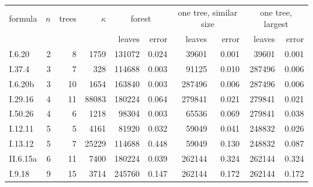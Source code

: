 \begin{tabular}{@{}lrrrrrrrrr@{}}\toprule
formula & $n$ & trees & $\kappa$ & \multicolumn{2}{c}{forest} & \multicolumn{2}{c}{one tree, similar size} & \multicolumn{2}{c}{one tree, largest}\\
 & & & & leaves & error & leaves & error & leaves & error\\\midrule
I.6.20 & 2 & 8 & 1759 & 131072 & 0.024 & 39601 & 0.001 & 39601 & 0.001\\
I.37.4 & 3 & 7 & 328 & 114688 & 0.003 & 91125 & 0.010 & 287496 & 0.006\\
I.6.20b & 3 & 10 & 1654 & 163840 & 0.003 & 287496 & 0.006 & 287496 & 0.006\\
I.29.16 & 4 & 11 & 88083 & 180224 & 0.064 & 279841 & 0.021 & 279841 & 0.021\\
I.50.26 & 4 & 6 & 1218 & 98304 & 0.003 & 65536 & 0.069 & 279841 & 0.038\\
I.12.11 & 5 & 5 & 4161 & 81920 & 0.032 & 59049 & 0.041 & 248832 & 0.026\\
I.13.12 & 5 & 7 & 25229 & 114688 & 0.448 & 59049 & 0.130 & 248832 & 0.087\\
II.6.15a & 6 & 11 & 7400 & 180224 & 0.039 & 262144 & 0.324 & 262144 & 0.324\\
I.9.18 & 9 & 15 & 3714 & 245760 & 0.147 & 262144 & 0.172 & 262144 & 0.172\\
\bottomrule\end{tabular}